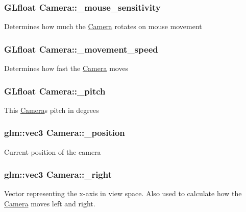 \subsubsection[{\texorpdfstring{\+\_\+mouse\+\_\+sensitivity}{_mouse_sensitivity}}]{\setlength{\rightskip}{0pt plus 5cm}G\+Lfloat Camera\+::\+\_\+mouse\+\_\+sensitivity}\hypertarget{classCamera_aeb483d642e0bcf11aa881467ac9676fe}{}\label{classCamera_aeb483d642e0bcf11aa881467ac9676fe}
Determines how much the \hyperlink{classCamera}{Camera} rotates on mouse movement 
\subsubsection[{\texorpdfstring{\+\_\+movement\+\_\+speed}{_movement_speed}}]{\setlength{\rightskip}{0pt plus 5cm}G\+Lfloat Camera\+::\+\_\+movement\+\_\+speed}\hypertarget{classCamera_a6f31b5658310866d3228614a755b59b0}{}\label{classCamera_a6f31b5658310866d3228614a755b59b0}
Determines how fast the \hyperlink{classCamera}{Camera} moves 
\subsubsection[{\texorpdfstring{\+\_\+pitch}{_pitch}}]{\setlength{\rightskip}{0pt plus 5cm}G\+Lfloat Camera\+::\+\_\+pitch}\hypertarget{classCamera_a23a8b8859c44721d7082b89809318918}{}\label{classCamera_a23a8b8859c44721d7082b89809318918}
This \hyperlink{classCamera}{Camera}\textquotesingle{}s pitch in degrees 
\subsubsection[{\texorpdfstring{\+\_\+position}{_position}}]{\setlength{\rightskip}{0pt plus 5cm}glm\+::vec3 Camera\+::\+\_\+position}\hypertarget{classCamera_a0a931ed2051befaad1f482b3b5e98ca0}{}\label{classCamera_a0a931ed2051befaad1f482b3b5e98ca0}
Current position of the camera 
\subsubsection[{\texorpdfstring{\+\_\+right}{_right}}]{\setlength{\rightskip}{0pt plus 5cm}glm\+::vec3 Camera\+::\+\_\+right}\hypertarget{classCamera_a4c556280ed181d8589c28eec7ebebb49}{}\label{classCamera_a4c556280ed181d8589c28eec7ebebb49}
Vector representing the x-\/axis in view space. Also used to calculate how the \hyperlink{classCamera}{Camera} moves left and right. 
